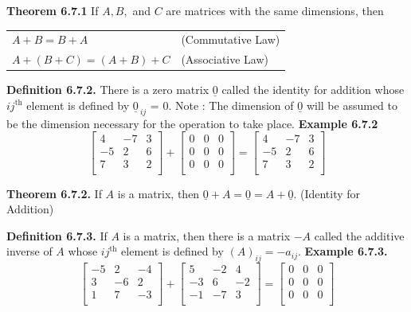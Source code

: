 \textbf{Theorem 6.7.1}  If $A,B,$ and $C$ are matrices with the same dimensions, then\nl
\begin{tabular}{l l}
$A + B = B + A$&(Commutative Law)\\
$A + (B+C) = (A + B) + C$&(Associative Law)\\
\end{tabular}\nl

\textbf{Definition 6.7.2.}  There is a zero matrix $\underline{0}$ called the identity for addition whose $ij^{\text{th}}$ element is defined by $\underline{0}_{~ij}$ = 0.\nl
Note : The dimension of $\underline{0}$ will be assumed to be the dimension necessary for the operation to take place.\nl
\textbf{Example 6.7.2}\nl
\begin{equation*}
\left[
\begin{array}{rrr}
4 & -7 & 3\\
-5&2&6\\
7&3&2\\
\end{array}
\right] +
\left[
\begin{array}{rrr}
0 & 0 &0 \\
0&0&0\\
0&0&0\\
\end{array}
\right]=
\left[
\begin{array}{rrr}
4 & -7 & 3\\
-5&2&6\\
7&3&2\\
\end{array}
\right]
\end{equation*}\nl

\textbf{Theorem 6.7.2.}  If $A$ is a matrix, then $\underline{0} + A = \underline{0} = A + \underline{0}.$  (Identity for Addition)\nl

\textbf{Definition 6.7.3.}  If $A$ is a matrix, then there is a matrix $-A$ called the additive inverse of $A$ whose $ij^{\text{th}}$ element is defined by $(A)_{ij} = -a_{ij}.$\nl
\newpage
\textbf{Example 6.7.3.}\nl
\begin{equation*}
\left[
\begin{array}{rrr}
-5 & 2 & -4\\
3&-6&2\\
1&7&-3\\
\end{array}
\right] +
\left[
\begin{array}{rrr}
5 & -2 & 4\\
-3&6&-2\\
-1&-7&3\\
\end{array}
\right]=
\left[
\begin{array}{rrr}
0 & 0 & 0\\
0&0&0\\
0&0&0\\
\end{array}
\right]
\end{equation*}\nl

